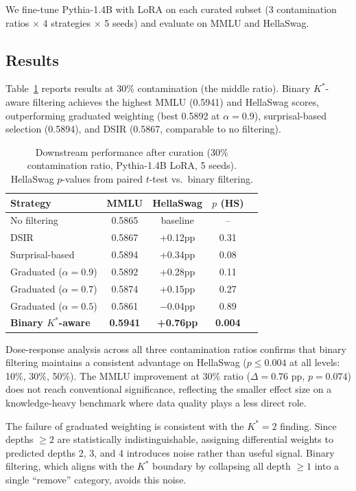 \documentclass[11pt,a4paper]{article}
\newcommand{\Kstar}{K^{*}}
\begin{document}
We fine-tune Pythia-1.4B with LoRA on each curated subset (3 contamination ratios $\times$ 4 strategies $\times$ 5 seeds) and evaluate on MMLU and HellaSwag.

\subsection{Results}

Table~\ref{tab:curation} reports results at 30\% contamination (the middle ratio). Binary $\Kstar$-aware filtering achieves the highest MMLU (0.5941) and HellaSwag scores, outperforming graduated weighting (best 0.5892 at $\alpha = 0.9$), surprisal-based selection (0.5894), and DSIR (0.5867, comparable to no filtering).

\begin{table}[t]
\centering
\caption{Downstream performance after curation (30\% contamination ratio, Pythia-1.4B LoRA, 5 seeds). HellaSwag $p$-values from paired $t$-test vs.\ binary filtering.}
\label{tab:curation}
\small
\begin{tabular}{lcccc}
\toprule
\textbf{Strategy} & \textbf{MMLU} & \textbf{HellaSwag} & \textbf{$p$ (HS)} \\
\midrule
No filtering        & 0.5865 & baseline & -- \\
DSIR                & 0.5867 & +0.12pp & 0.31 \\
Surprisal-based     & 0.5894 & +0.34pp & 0.08 \\
Graduated ($\alpha=0.9$) & 0.5892 & +0.28pp & 0.11 \\
Graduated ($\alpha=0.7$) & 0.5874 & +0.15pp & 0.27 \\
Graduated ($\alpha=0.5$) & 0.5861 & $-$0.04pp & 0.89 \\
\textbf{Binary $\Kstar$-aware} & \textbf{0.5941} & \textbf{+0.76pp} & \textbf{0.004} \\
\bottomrule
\end{tabular}
\end{table}

Dose-response analysis across all three contamination ratios confirms that binary filtering maintains a consistent advantage on HellaSwag ($p \leq 0.004$ at all levels: 10\%, 30\%, 50\%). The MMLU improvement at 30\% ratio ($\Delta = 0.76$ pp, $p = 0.074$) does not reach conventional significance, reflecting the smaller effect size on a knowledge-heavy benchmark where data quality plays a less direct role.

The failure of graduated weighting is consistent with the $\Kstar = 2$ finding. Since depths $\geq 2$ are statistically indistinguishable, assigning differential weights to predicted depths 2, 3, and 4 introduces noise rather than useful signal. Binary filtering, which aligns with the $\Kstar$ boundary by collapsing all depth $\geq 1$ into a single ``remove'' category, avoids this noise.
\end{document}
